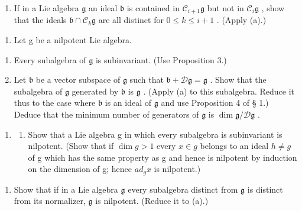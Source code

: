 \begin{enumerate}
\def\labelenumi{(\alph{enumi})}
\setcounter{enumi}{1}
\tightlist
\item
  If in a Lie algebra \(\mathfrak{g}\) an ideal \(\mathfrak{b}\) is contained in \(\mathcal{C}_{i+1}\mathfrak{g}\) but not in \(\mathcal{C}_i\mathfrak{g}\) , show that the ideals \(\mathfrak{b} \cap \mathcal{C}_k\mathfrak{g}\) are all distinct for \(0 \leqslant k \leqslant i + 1\) . (Apply (a).)
\end{enumerate}

\begin{enumerate}
\def\labelenumi{\arabic{enumi}.}
\setcounter{enumi}{3}
\tightlist
\item
  Let g be a nilpotent Lie algebra.
\end{enumerate}

\begin{enumerate}
\def\labelenumi{(\alph{enumi})}
\item
  Every subalgebra of \(\mathfrak{g}\) is subinvariant. (Use Proposition 3.)
\item
  Let \(\mathfrak{b}\) be a vector subspace of \(\mathfrak{g}\) such that \(\mathfrak{b} + \mathcal{D}\mathfrak{g} = \mathfrak{g}\) . Show that the subalgebra of \(\mathfrak{g}\) generated by \(\mathfrak{b}\) is \(\mathfrak{g}\) . (Apply (a) to this subalgebra. Reduce it thus to the case where \(\mathfrak{b}\) is an ideal of \(\mathfrak{g}\) and use Proposition 4 of § 1.) Deduce that the minimum number of generators of \(\mathfrak{g}\) is \(\dim \mathfrak{g}/\mathcal{D}\mathfrak{g}\) .
\end{enumerate}

\begin{enumerate}
\def\labelenumi{\arabic{enumi}.}
\setcounter{enumi}{4}
\tightlist
\item
  \begin{enumerate}
  \def\labelenumii{(\alph{enumii})}
  \tightlist
  \item
    Show that a Lie algebra g in which every subalgebra is subinvariant is nilpotent. (Show that if \(\dim g > 1\) every \(x \in g\) belongs to an ideal \(h \neq g\) of g which has the same property as g and hence is nilpotent by induction on the dimension of g; hence \(ad_{g} x\) is nilpotent.)
  \end{enumerate}
\end{enumerate}

\begin{enumerate}
\def\labelenumi{(\alph{enumi})}
\setcounter{enumi}{1}
\tightlist
\item
  Show that if in a Lie algebra \(\mathfrak{g}\) every subalgebra distinct from \(\mathfrak{g}\) is distinct from its normalizer, \(\mathfrak{g}\) is nilpotent. (Reduce it to (a).)
\end{enumerate}

